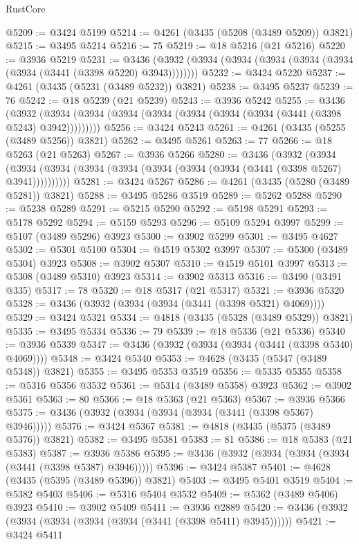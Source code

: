\begin{lexlean}{RustCore}
\begin{coremodule}
@5209 := @3424 @5199
@5214 := @4261 (@3435 (@5208 (@3489 @5209)) @3821)
@5215 := @3495 @5214
@5216 := 75
@5219 := @18 @5216 (@21 @5216)
@5220 := @3936 @5219
@5231 := @3436 (@3932 (@3934 (@3934 (@3934 (@3934 (@3934 (@3934 (@3441 (@3398 @5220) @3943))))))))
@5232 := @3424 @5220
@5237 := @4261 (@3435 (@5231 (@3489 @5232)) @3821)
@5238 := @3495 @5237
@5239 := 76
@5242 := @18 @5239 (@21 @5239)
@5243 := @3936 @5242
@5255 := @3436
    (@3932 (@3934 (@3934 (@3934 (@3934 (@3934 (@3934 (@3934 (@3441 (@3398 @5243) @3942)))))))))
@5256 := @3424 @5243
@5261 := @4261 (@3435 (@5255 (@3489 @5256)) @3821)
@5262 := @3495 @5261
@5263 := 77
@5266 := @18 @5263 (@21 @5263)
@5267 := @3936 @5266
@5280 := @3436
    (@3932
      (@3934 (@3934 (@3934 (@3934 (@3934 (@3934 (@3934 (@3934 (@3441 (@3398 @5267) @3941))))))))))
@5281 := @3424 @5267
@5286 := @4261 (@3435 (@5280 (@3489 @5281)) @3821)
@5288 := @3495 @5286 @3519
@5289 := @5262 @5288
@5290 := @5238 @5289
@5291 := @5215 @5290
@5292 := @5198 @5291
@5293 := @5178 @5292
@5294 := @5159 @5293
@5296 := @5109 @5294 @3997
@5299 := @5107 (@3489 @5296) @3923
@5300 := @3902 @5299
@5301 := @3495 @4627
@5302 := @5301 @5100
@5304 := @4519 @5302 @3997
@5307 := @5300 (@3489 @5304) @3923
@5308 := @3902 @5307
@5310 := @4519 @5101 @3997
@5313 := @5308 (@3489 @5310) @3923
@5314 := @3902 @5313
@5316 := @3490 (@3491 @335)
@5317 := 78
@5320 := @18 @5317 (@21 @5317)
@5321 := @3936 @5320
@5328 := @3436 (@3932 (@3934 (@3934 (@3441 (@3398 @5321) @4069))))
@5329 := @3424 @5321
@5334 := @4818 (@3435 (@5328 (@3489 @5329)) @3821)
@5335 := @3495 @5334
@5336 := 79
@5339 := @18 @5336 (@21 @5336)
@5340 := @3936 @5339
@5347 := @3436 (@3932 (@3934 (@3934 (@3441 (@3398 @5340) @4069))))
@5348 := @3424 @5340
@5353 := @4628 (@3435 (@5347 (@3489 @5348)) @3821)
@5355 := @3495 @5353 @3519
@5356 := @5335 @5355
@5358 := @5316 @5356 @3532
@5361 := @5314 (@3489 @5358) @3923
@5362 := @3902 @5361
@5363 := 80
@5366 := @18 @5363 (@21 @5363)
@5367 := @3936 @5366
@5375 := @3436 (@3932 (@3934 (@3934 (@3934 (@3441 (@3398 @5367) @3946)))))
@5376 := @3424 @5367
@5381 := @4818 (@3435 (@5375 (@3489 @5376)) @3821)
@5382 := @3495 @5381
@5383 := 81
@5386 := @18 @5383 (@21 @5383)
@5387 := @3936 @5386
@5395 := @3436 (@3932 (@3934 (@3934 (@3934 (@3441 (@3398 @5387) @3946)))))
@5396 := @3424 @5387
@5401 := @4628 (@3435 (@5395 (@3489 @5396)) @3821)
@5403 := @3495 @5401 @3519
@5404 := @5382 @5403
@5406 := @5316 @5404 @3532
@5409 := @5362 (@3489 @5406) @3923
@5410 := @3902 @5409
@5411 := @3936 @2889
@5420 := @3436 (@3932 (@3934 (@3934 (@3934 (@3934 (@3441 (@3398 @5411) @3945))))))
@5421 := @3424 @5411

\end{coremodule}
\end{lexlean}
